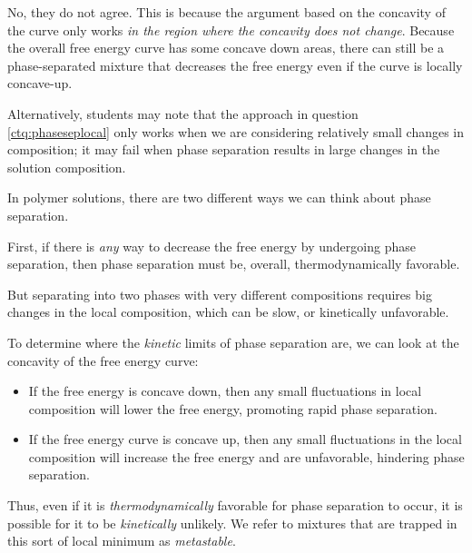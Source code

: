 \begin{activity}
\begin{ctqs}
			\begin{solution}[1.5in]
			
				No, they do not agree.  This is because the argument based on the concavity of the curve only works \emph{in the region where the concavity does not change}.  Because the overall free energy curve has some concave down areas, there can still be a phase-separated mixture that decreases the free energy even if the curve is locally concave-up.
				
				Alternatively, students may note that the approach in question \ref{ctq:phaseseplocal} only works when we are considering relatively small changes in composition; it may fail when phase separation results in large changes in the solution composition.
			
			\end{solution}
			
\end{ctqs}

\begin{infobox}
	In polymer solutions, there are two different ways we can think about phase separation.
	
	First, if there is \emph{any} way to decrease the free energy by undergoing phase separation, then phase separation must be, overall, thermodynamically favorable.
	
	But separating into two phases with very different compositions requires big changes in the local composition, which can be slow, or kinetically unfavorable.
	
	To determine where the \emph{kinetic} limits of phase separation are, we can look at the concavity of the free energy curve:
	\begin{itemize}
		\item If the free energy is concave down, then any small fluctuations in local composition will lower the free energy, promoting rapid phase separation.
		\item If the free energy curve is concave up, then any small fluctuations in the local composition will increase the free energy and are unfavorable, hindering phase separation.
	\end{itemize}
	
	Thus, even if it is \emph{thermodynamically} favorable for phase separation to occur, it is possible for it to be \emph{kinetically} unlikely.  We refer to mixtures that are trapped in this sort of local minimum as \emph{metastable}.
	
\end{infobox}


\end{activity}
